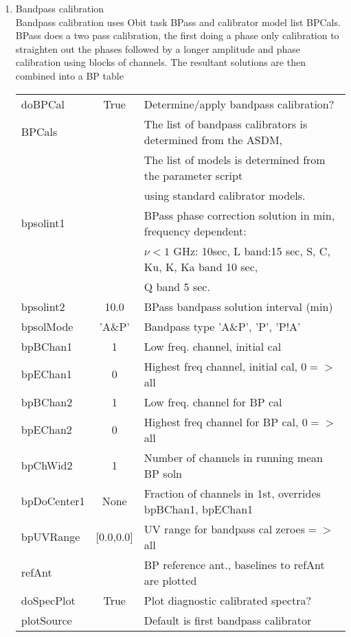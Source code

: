 \documentclass[11pt]{article}
\begin{document}
\begin{enumerate}
\begin{center}
\begin{tabular}{|l|c|l|}
\hline
\end{tabular}
\end{center}
\newpage
%
\item Bandpass calibration\\
Bandpass calibration uses Obit task BPass and calibrator model list BPCals.
BPass does a two pass calibration, the first doing a phase only
calibration to straighten out the phases followed by a longer amplitude
and phase calibration using blocks of channels.
The resultant solutions are then combined into a BP table
\begin{center}
\begin{tabular}{|l|c|l|}
\hline
doBPCal  & True &  Determine/apply bandpass calibration? \\
BPCals  &  & The list of bandpass calibrators is determined from the ASDM, \\
  &  & The list of models is determined from the parameter script \\
  & & using standard calibrator models. \\
bpsolint1  &  &  BPass phase correction solution in min, frequency
dependent: \\
 & &  $\nu<1$ GHz: 10sec, L band:15 sec, S, C, Ku, K, Ka  band 10 sec,
\\
 & &  Q band 5 sec. \\
bpsolint2  & 10.0 & BPass bandpass solution interval (min) \\
bpsolMode  & 'A\&P'  &  Bandpass type 'A\&P', 'P', 'P!A'\\
bpBChan1  & 1 &  Low freq. channel,  initial cal\\
bpEChan1  & 0 &  Highest freq channel, initial cal, 0$=>$all\\
bpBChan2  & 1 &  Low freq. channel for BP cal\\
bpEChan2  & 0 &  Highest freq channel for BP cal,  0$=>$all \\
bpChWid2  & 1 &  Number of channels in running mean BP soln\\
bpDoCenter1  & None &  Fraction of  channels in 1st, overrides
bpBChan1, bpEChan1\\
bpUVRange  & [0.0,0.0] &  UV range for bandpass cal zeroes$=>$ all\\
refAnt  &  & BP reference ant., baselines to refAnt are plotted \\
doSpecPlot     & True &  Plot diagnostic calibrated spectra?\\
plotSource     & & Default is first bandpass calibrator\\

\end{tabular}
\end{center}
\end{enumerate}
\end{document}
